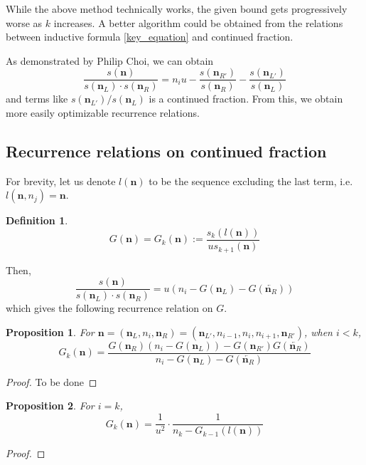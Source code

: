 \documentclass{article}
\theoremstyle{definition}
\newtheorem*{definition}{Definition}
\theoremstyle{plain}
\newtheorem{proposition}{Proposition}[section]
\theoremstyle{remark}
\numberwithin{equation}{section}
\begin{document}
While the above method technically works,
the given bound gets progressively worse as $k$ increases.
A better algorithm could be obtained from the relations between
inductive formula \eqref{key_equation} and continued fraction.

As demonstrated by Philip Choi, we can obtain
\[
  \frac{s(\mathbf{n})}{s(\mathbf{n}_L) \cdot s(\mathbf{n}_R)}
  = n_i u - \frac{s(\mathbf{n}_{R'})}{s(\mathbf{n}_R)} - \frac{s(\mathbf{n}_{L'})}{s(\mathbf{n}_L)}
\]
and terms like $s(\mathbf{n}_{L'}) / s(\mathbf{n}_L)$ is a continued fraction.
From this, we obtain more easily optimizable recurrence relations.

\subsection{Recurrence relations on continued fraction}

For brevity, let us denote $l(\mathbf{n})$ to be the sequence excluding the last term,
i.e. $l(\mathbf{n}, n_j) = \mathbf{n}$.

\begin{definition}
  \[ G(\mathbf{n}) = G_k(\mathbf{n}) := \frac{s_k(l(\mathbf{n}))}{u s_{k+1}(\mathbf{n})} \]
\end{definition}

Then,
\[
  \frac{s(\mathbf{n})}{s(\mathbf{n}_L) \cdot s(\mathbf{n}_R)}
  = u (n_i - G(\mathbf{n}_L) - G(\overleftarrow{\mathbf{n}_R}))
\]
which gives the following recurrence relation on $G$.

\begin{proposition}\label{fraction_recurrence}
  For $\mathbf{n} = (\mathbf{n}_L, n_i, \mathbf{n}_R)
  = (\mathbf{n}_{L'}, n_{i-1}, n_i, n_{i+1}, \mathbf{n}_{R'})$, when $i < k$,
  \[
    G_k(\mathbf{n}) = \frac{
      G(\mathbf{n}_R) (n_i - G(\mathbf{n}_L)) - G(\mathbf{n}_{R'}) G(\overleftarrow{\mathbf{n}_R})
    }{ n_i - G(\mathbf{n}_L) - G(\overleftarrow{\mathbf{n}_R}) }
  \]
\end{proposition}
\begin{proof}
  To be done
\end{proof}

\begin{proposition}
  For $i = k$,
  \[
    G_k(\mathbf{n}) = \frac{1}{u^2} \cdot \frac{1}{n_k - G_{k-1}(l(\mathbf{n}))}
  \]
\end{proposition}
\begin{proof}
  
\end{proof}
\end{document}
